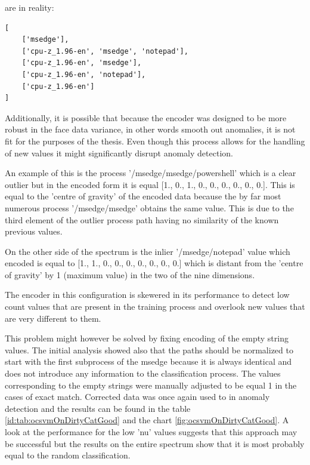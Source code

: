 \documentclass[a4paper,twoside,12pt]{book}
\begin{document}
are in reality:

\begin{lstlisting}
[
	['msedge'],
	['cpu-z_1.96-en', 'msedge', 'notepad'],
	['cpu-z_1.96-en', 'msedge'],
	['cpu-z_1.96-en', 'notepad'],
	['cpu-z_1.96-en']
]
\end{lstlisting}

Additionally, it is possible that because the encoder was designed to be more robust in the face 
data variance, in other words smooth out anomalies, it is not fit for the purposes of the thesis. 
Even though this process allows for the handling of new values it might significantly disrupt anomaly detection.

An example of this is the process '/msedge/msedge/powershell' which is a clear outlier
but in the encoded form it is equal [1., 0., 1., 0., 0., 0., 0., 0., 0.]. This is equal
to the 'centre of gravity' of the encoded data because the by far most numerous process
'/msedge/msedge' obtains the same value. This is due to the third element of the outlier process  
path having no similarity of the known previous values.

On the other side of the spectrum is the inlier '/msedge/notepad' value which encoded is equal to
[1., 1., 0., 0., 0., 0., 0., 0., 0.] which is distant from the 'centre of gravity' by 1 (maximum 
value) in the two of the nine dimensions. 

The encoder in this configuration is skewered in its performance to detect low count values that
are present in the training process and overlook new values that are very different to them. 

This problem might however be solved by fixing encoding of the empty string values. The
initial analysis showed also that the paths should be normalized to start with the first 
subprocess of the msedge because it is always identical and does not introduce any information
to the classification process. The values corresponding to the empty strings were manually adjusted
to be equal 1 in the cases of exact match. Corrected data was once again used to in anomaly detection
and the results can be found in the table \ref{id:tab:ocsvmOnDirtyCatGood} and the chart \ref{fig:ocsvmOnDirtyCatGood}. 
A look at the performance for the low 'nu' values suggests that this approach may be successful but 
the results on the entire spectrum show that it is most probably equal to the random classification.
\end{document}
